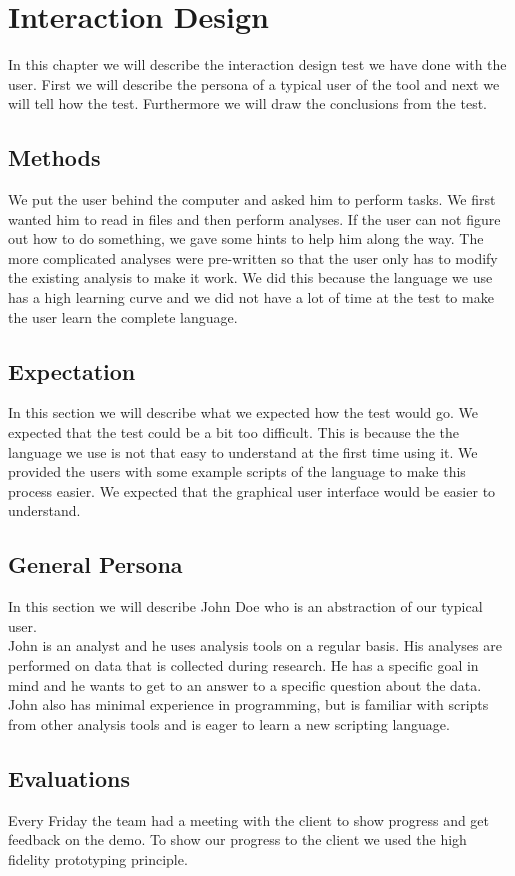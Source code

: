 \chapter{Interaction Design} %
In this chapter we will describe the interaction design test we have done with the user. First we will describe the persona of a typical user of the tool and next we will tell how the test. Furthermore we will draw the conclusions from the test.

\section{Methods}
We put the user behind the computer and asked him to perform tasks. We first wanted him to read in files and then perform analyses. If the user can not figure out how to do something, we gave some hints to help him along the way. The more complicated analyses were pre-written so that the user only has to modify the existing analysis to make it work. We did this because the language we use has a high learning curve and we did not have a lot of time at the test to make the user learn the complete language.

\section{Expectation}
In this section we will describe what we expected how the test would go. We expected that the test could be a bit too difficult. This is because the the language we use is not that easy to understand at the first time using it. We provided the users with some example scripts of the language to make this process easier.
We expected that the graphical user interface would be easier to understand.

\section{General Persona}
In this section we will describe John Doe who is an abstraction of our typical user.\\
John is an analyst and he uses analysis tools on a regular basis. His analyses are performed on data that is collected during research. He has a specific goal in mind and he wants to get to an answer to a specific question about the data. John also has minimal experience in programming, but is familiar with scripts from other analysis tools and is eager to learn a new scripting language.

\section{Evaluations}
Every Friday the team had a meeting with the client to show progress and get feedback on the demo. To show our progress to the client we used the high fidelity prototyping principle.
